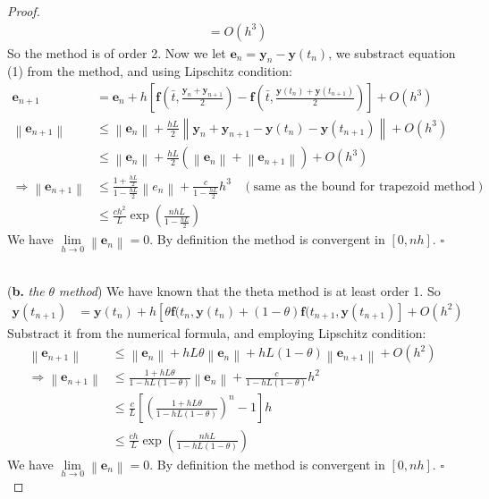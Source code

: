 \documentclass[a4paper, 10pt]{article}
\theoremstyle{definition}
\theoremstyle{hSol}
\begin{document}
\begin{proof}
\begin{equation}
\begin{split}
    &= O(h^3)
  \end{split}
\end{equation}
So the method is of order 2. Now we let $\bm{e}_n = \bm{y}_n - \bm{y}(t_n)$, we substract equation (1) from the method, and using Lipschitz condition:
\begin{equation}
  \begin{split}
    \bm{e}_{n+1} &= \bm{e}_n + h\left[\bm{f}(\bar{t}, \tfrac{\bm{y}_n + \bm{y}_{n+1}}{2})-\bm{f}(\bar{t}, \tfrac{\bm{y}(t_n)+\bm{y}(t_{n+1})}{2})\right] + O(h^3) \\
    \left\|\bm{e}_{n+1}\right\|& \leq \left\|\bm{e}_n\right\| + \tfrac{hL}{2} \left\|\bm{y}_n + \bm{y}_{n+1}-\bm{y}(t_n)-\bm{y}(t_{n+1})\right\| + O(h^3) \\
    & \leq \left\|\bm{e}_n\right\| + \tfrac{hL}{2}(\left\|\bm{e}_n\right\| + \left\|\bm{e}_{n+1}\right\|) + O(h^3) \\
    \Rightarrow \left\|\bm{e}_{n+1}\right\| & \leq \frac{1+\tfrac{hL}{2}}{1-\tfrac{hL}{2}} \left\|e_n\right\| + \frac{c}{1-\tfrac{hL}{2}}h^3~~~~(\text{same as the bound for trapezoid method}) \\
    & \leq \frac{ch^2}{L}\exp{\left(\frac{nhL}{1-\frac{hL}{2}}\right)}
  \end{split}
\end{equation}
We have $\lim\limits_{h\rightarrow0} \left\|\bm{e}_n\right\| = 0$. By definition the method is convergent in $[0, nh]$. $\square$

~\\
(\textbf{b.} \emph{the} $\theta$ \emph{method}) We have known that the theta method is at least order 1. So
\begin{equation}
  \begin{split}
      \bm{y}(t_{n+1}) &= \bm{y}(t_n) + h \left[\theta \bm{f}(t_n, \bm{y}(t_n)+(1-\theta)\bm{f}(t_{n+1}, \bm{y}(t_{n+1})\right] + O(h^2)
  \end{split}
\end{equation}
Substract it from the numerical formula, and employing Lipschitz condition:
\begin{equation}
  \begin{split}
    \left\|\bm{e}_{n+1}\right\| &\leq \left\|\bm{e}_n\right\| + hL\theta \left\|\bm{e}_n\right\| + hL(1-\theta) \left\|\bm{e}_{n+1}\right\| + O(h^2) \\
    \Rightarrow \left\|\bm{e}_{n+1}\right\| &\leq \frac{1+hL\theta}{1-hL(1-\theta)} \left\|\bm{e}_n\right\| + \frac{c}{1-hL(1-\theta)}h^2 \\
    & \leq \frac{c}{L}\left[\left(\frac{1+hL\theta}{1-hL(1-\theta)} \right)^n -1\right]h \\
    & \leq \frac{ch}{L} \exp\left(\frac{nhL}{1-hL(1-\theta)}\right)
  \end{split}
\end{equation}
We have $\lim\limits_{h\rightarrow0} \left\|\bm{e}_n\right\| = 0$. By definition the method is convergent in $[0, nh]$. $\square$
\end{proof} 
\end{document}
